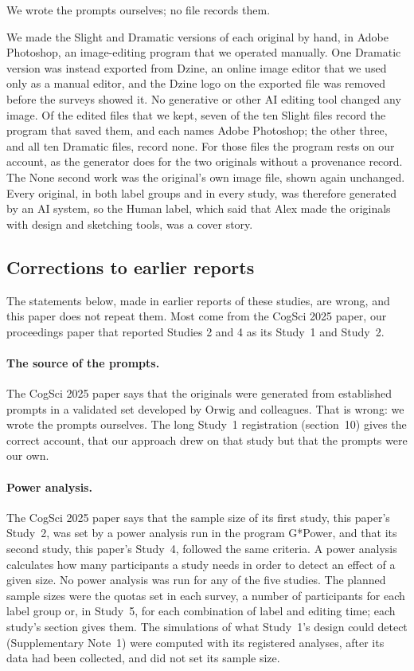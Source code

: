 We wrote the prompts ourselves; no file records them.

We made the Slight and Dramatic versions of each original by hand, in Adobe Photoshop, an image-editing program that we operated manually. One Dramatic version was instead exported from Dzine, an online image editor that we used only as a manual editor, and the Dzine logo on the exported file was removed before the surveys showed it. No generative or other AI editing tool changed any image. Of the edited files that we kept, seven of the ten Slight files record the program that saved them, and each names Adobe Photoshop; the other three, and all ten Dramatic files, record none. For those files the program rests on our account, as the generator does for the two originals without a provenance record. The None second work was the original's own image file, shown again unchanged. Every original, in both label groups and in every study, was therefore generated by an AI system, so the Human label, which said that Alex made the originals with design and sketching tools, was a cover story.

\subsection*{Corrections to earlier reports}

The statements below, made in earlier reports of these studies, are wrong, and this paper does not repeat them. Most come from the CogSci 2025 paper,\cite{kamper2025originalsin} our proceedings paper that reported Studies 2 and 4 as its Study~1 and Study~2.

\paragraph*{The source of the prompts.}
The CogSci 2025 paper says that the originals were generated from established prompts in a validated set developed by Orwig and colleagues.\cite{orwig2026using} That is wrong: we wrote the prompts ourselves. The long Study~1 registration (section~10) gives the correct account, that our approach drew on that study but that the prompts were our own.

\paragraph*{Power analysis.}
The CogSci 2025 paper says that the sample size of its first study, this paper's Study~2, was set by a power analysis run in the program G*Power, and that its second study, this paper's Study~4, followed the same criteria. A power analysis calculates how many participants a study needs in order to detect an effect of a given size. No power analysis was run for any of the five studies. The planned sample sizes were the quotas set in each survey, a number of participants for each label group or, in Study~5, for each combination of label and editing time; each study's section gives them. The simulations of what Study~1's design could detect (Supplementary Note~1) were computed with its registered analyses, after its data had been collected, and did not set its sample size.

